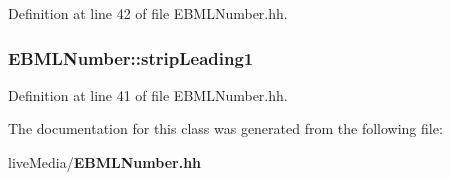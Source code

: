 Definition at line 42 of file E\+B\+M\+L\+Number.\+hh.

\subsubsection[{strip\+Leading1}]{ E\+B\+M\+L\+Number\+::strip\+Leading1\hspace{0.3cm}{\ttfamily [inherited]}}\label{classEBMLNumber_a6a5eeb12e3e64758586ce890b4beafca}


Definition at line 41 of file E\+B\+M\+L\+Number.\+hh.



The documentation for this class was generated from the following file\+:\begin{DoxyCompactItemize}
\item 
live\+Media/{\bf E\+B\+M\+L\+Number.\+hh}\end{DoxyCompactItemize}
